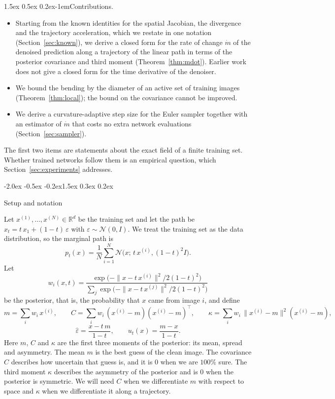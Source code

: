 \documentclass{article}
\makeatletter
\renewcommand{\normalsize}{\fontsize{10pt}{11pt}\selectfont}
\renewcommand{\section}{\@startsection{section}{1}{\z@}%
  {-2.0ex \@plus -0.5ex \@minus -0.2ex}{1.5ex \@plus 0.3ex \@minus 0.2ex}{\large\bfseries\raggedright}}
\renewcommand{\paragraph}{\@startsection{paragraph}{4}{\z@}%
  {1.5ex \@plus 0.5ex \@minus 0.2ex}{-1em}{\normalsize\bfseries}}
\theoremstyle{remark}
\newcommand{\R}{\mathbb{R}}
\newcommand{\xn}[1]{x^{(#1)}}
\newcommand{\eps}{\hat\varepsilon}
\makeatother
\begin{document}
\paragraph{Contributions.}
\begin{itemize}
  \item Starting from the known identities for the spatial Jacobian, the divergence and the trajectory acceleration, which we restate in one notation (Section~\ref{sec:known}), we derive a closed form for the rate of change $\dot m$ of the denoised prediction along a trajectory of the linear path in terms of the posterior covariance and third moment (Theorem~\ref{thm:mdot}). Earlier work does not give a closed form for the time derivative of the denoiser.
  \item We bound the bending by the diameter of an active set of training images (Theorem~\ref{thm:local}); the bound on the covariance cannot be improved.
  \item We derive a curvature-adaptive step size for the Euler sampler together with an estimator of $\dot m$ that costs no extra network evaluations (Section~\ref{sec:sampler}).
\end{itemize}
The first two items are statements about the exact field of a finite training set. Whether trained networks follow them is an empirical question, which Section~\ref{sec:experiments} addresses.

\section{Setup and notation}\label{sec:setup}

Let $\xn{1},\dots,\xn{N} \in \R^d$ be the training set and let the path be $x_t = t\,x_1 + (1 - t)\,\varepsilon$ with $\varepsilon \sim \mathcal N(0,I)$. We treat the training set as the data distribution, so the marginal path is
$$
  p_t(x) = \frac1N\sum_{i = 1}^N\mathcal N\big(x;\,t\,\xn{i},(1 - t)^2I\big).
$$
Let
\begin{equation}\label{eq:w}
  w_i(x,t) = \frac{\exp\!\big(-\|x - t\,\xn{i}\|^2/2(1 - t)^2\big)}{\sum_j\exp\!\big(-\|x - t\,\xn{j}\|^2/2(1 - t)^2\big)}
\end{equation}
be the posterior, that is, the probability that $x$ came from image $i$, and define
\begin{equation}\label{eq:moments}
  m = \sum_i w_i\,\xn{i},\qquad
  C = \sum_i w_i\,(\xn{i} - m)(\xn{i} - m)^\top,\qquad
  \kappa = \sum_i w_i\,\|\xn{i} - m\|^2(\xn{i} - m),
\end{equation}
\begin{equation}\label{eq:u}
  \eps = \frac{x - t\,m}{1 - t},\qquad u_t(x) = \frac{m - x}{1 - t}.
\end{equation}
Here $m$, $C$ and $\kappa$ are the first three moments of the posterior: its mean, spread and asymmetry. The mean $m$ is the best guess of the clean image. The covariance $C$ describes how uncertain that guess is, and it is $0$ when we are $100\%$ sure. The third moment $\kappa$ describes the asymmetry of the posterior and is $0$ when the posterior is symmetric. We will need $C$ when we differentiate $m$ with respect to space and $\kappa$ when we differentiate it along a trajectory.
\end{document}
